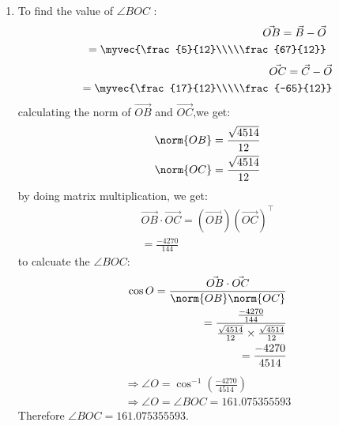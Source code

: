 \documentclass[journal,12pt,twocolumn]{IEEEtran}
\theoremstyle{remark}
\begin{document}
\begin{enumerate}
	\item To find  the value of $\angle{BOC}$ :
\begin{align}
\Vec{OB}=\Vec{B}-\Vec{O}\\
          =\myvec{\frac{5}{12}\\\\\frac{67}{12}}
\end{align}
\vspace{0.1cm}
\begin{align}
\Vec{OC}=\Vec{C}-\Vec{O}\\
          =\myvec{\frac{17}{12}\\\\\frac{-65}{12}}
\end{align}
\vspace{0.1cm}
calculating the norm of $\Vec{OB}$ and $\Vec{OC}$,we get:
\begin{align}
	\norm{OB}= \frac{\sqrt{4514}}{12}\\
	\norm{OC}= \frac{\sqrt{4514}}{12}
\end{align}
\vspace{0.2cm}
by doing matrix multiplication, we get:
\begin{align}
\Vec{OB}\cdot\Vec{OC}=(\Vec{OB})(\Vec{OC})^\intercal\\
=\frac{-4270}{144}
\end{align}
\vspace{0.2cm}
to calcuate the $\angle{BOC}$:
\begin{align}
	\cos{O}=\frac{\Vec{OB}\cdot\Vec{OC}}{\norm{OB}\norm{OC}}\\
=\frac{\frac{-4270}{144}}{\frac{\sqrt{4514}}{12}\times\frac{\sqrt{4514}}{12}}\\
=\frac{-4270}{4514}
\end{align}
\vspace{0.1cm}
\begin{align}
\Rightarrow\angle{O}=\cos^{-1}\left(\frac{-4270}{4514}\right)\\
\Rightarrow\angle{O}=\angle{BOC}=161.075355593
\end{align}
\vspace{0.4cm}
Therefore $\angle{BOC}=161.075355593$.
\vspace{0.25cm}







\end{enumerate}
\end{document}
